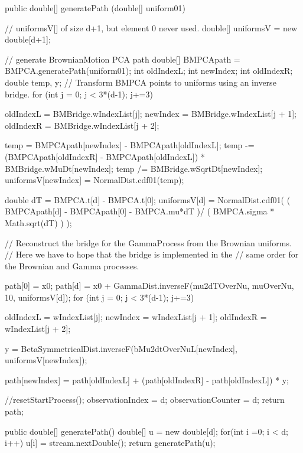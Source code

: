 \begin{code}\begin{hide}

   public double[] generatePath (double[] uniform01)  {
    // uniformsV[] of size d+1, but element 0 never used.
        double[] uniformsV = new double[d+1];

    // generate BrownianMotion PCA path
        double[] BMPCApath = BMPCA.generatePath(uniform01);
        int oldIndexL;
        int newIndex;
        int oldIndexR;
        double temp, y;
    // Transform BMPCA points to uniforms using an inverse bridge.
        for (int j = 0; j < 3*(d-1); j+=3) {
            oldIndexL   = BMBridge.wIndexList[j];
            newIndex    = BMBridge.wIndexList[j + 1];
            oldIndexR   = BMBridge.wIndexList[j + 2];

            temp = BMPCApath[newIndex] - BMPCApath[oldIndexL];
            temp -= (BMPCApath[oldIndexR] - BMPCApath[oldIndexL]) *
                                          BMBridge.wMuDt[newIndex];
            temp /= BMBridge.wSqrtDt[newIndex];
            uniformsV[newIndex] = NormalDist.cdf01(temp);
        }
    double dT = BMPCA.t[d] - BMPCA.t[0];
    uniformsV[d] = NormalDist.cdf01( ( BMPCApath[d] - BMPCApath[0] - BMPCA.mu*dT )/
                     ( BMPCA.sigma * Math.sqrt(dT) ) );


    // Reconstruct the bridge for the GammaProcess from the Brownian uniforms.
    // Here we have to hope that the bridge is implemented in the
    // same order for the Brownian and Gamma processes.

        path[0] = x0;
        path[d] = x0 + GammaDist.inverseF(mu2dTOverNu, muOverNu, 10, uniformsV[d]);
        for (int j = 0; j < 3*(d-1); j+=3) {
            oldIndexL   = wIndexList[j];
            newIndex    = wIndexList[j + 1];
            oldIndexR   = wIndexList[j + 2];

            y = BetaSymmetricalDist.inverseF(bMu2dtOverNuL[newIndex], uniformsV[newIndex]);

            path[newIndex] = path[oldIndexL] +
        (path[oldIndexR] - path[oldIndexL]) * y;
        }
        //resetStartProcess();
        observationIndex   = d;
        observationCounter = d;
        return path;
    }


   public double[] generatePath()  {
        double[] u = new double[d];
        for(int i =0; i < d; i++)
            u[i] = stream.nextDouble();
        return generatePath(u);
    }



\end{hide}
\end{code}
